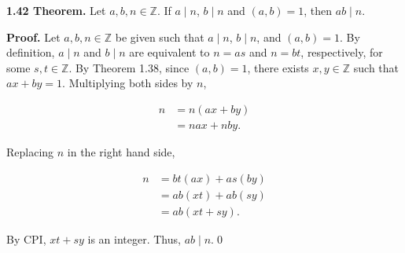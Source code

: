 \documentclass[12pt]{article}
\begin{document}
\noindent\textbf{1.42 Theorem.} Let $a,b,n\in\mathbb{Z}$. If $a\mid n$, $b\mid n$ and $(a,b)=1$, then $ab\mid n$.

\bigskip

\noindent\textbf{Proof.} Let $a,b,n\in\mathbb{Z}$ be given such that $a\mid n$, $b\mid n$, and $(a,b)=1$. By definition, $a\mid n$ and $b\mid n$ are equivalent to $n=as$ and $n=bt$, respectively, for some $s,t\in\mathbb{Z}$. By Theorem 1.38, since $(a,b)=1$, there exists $x,y\in\mathbb{Z}$ such that $ax+by=1$. Multiplying both sides by $n$,

\begin{align*}
n &= n(ax+by) \\
&= nax + nby.
\end{align*}

\noindent Replacing $n$ in the right hand side,

\begin{align*}
n &= bt(ax) + as(by) \\
&= ab(xt) + ab(sy)\\
&= ab(xt+sy).
\end{align*}

\noindent By CPI, $xt+sy$ is an integer. Thus, $ab\mid n$.\qed
\end{document}

